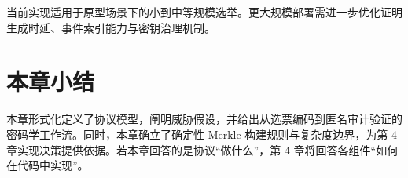 当前实现适用于原型场景下的小到中等规模选举。更大规模部署需进一步优化证明生成时延、事件索引能力与密钥治理机制。

\section{本章小结}

本章形式化定义了协议模型，阐明威胁假设，并给出从选票编码到匿名审计验证的密码学工作流。同时，本章确立了确定性 Merkle 构建规则与复杂度边界，为第 4 章实现决策提供依据。若本章回答的是协议“做什么”，第 4 章将回答各组件“如何在代码中实现”。

\endgroup




